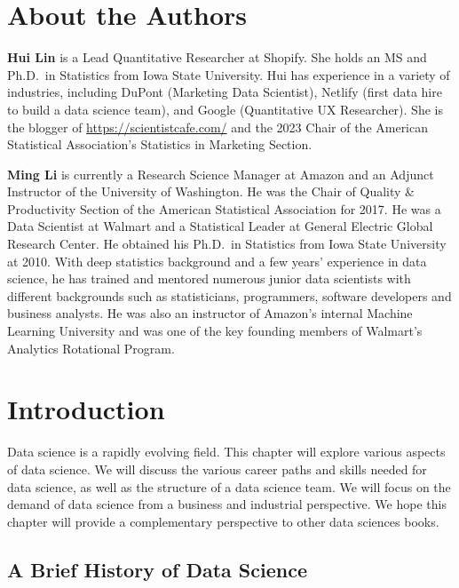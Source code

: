 \documentclass[
  12pt,
]{krantz}
\begin{document}
\hypertarget{about-the-authors}{%
\chapter*{About the Authors}\label{about-the-authors}}


\textbf{Hui Lin} is a Lead Quantitative Researcher at Shopify. She holds an MS and Ph.D.~in Statistics from Iowa State University. Hui has experience in a variety of industries, including DuPont (Marketing Data Scientist), Netlify (first data hire to build a data science team), and Google (Quantitative UX Researcher). She is the blogger of \url{https://scientistcafe.com/} and the 2023 Chair of the American Statistical Association's Statistics in Marketing Section.

\textbf{Ming Li} is currently a Research Science Manager at Amazon and an Adjunct Instructor of the University of Washington. He was the Chair of Quality \& Productivity Section of the American Statistical Association for 2017. He was a Data Scientist at Walmart and a Statistical Leader at General Electric Global Research Center. He obtained his Ph.D.~in Statistics from Iowa State University at 2010. With deep statistics background and a few years' experience in data science, he has trained and mentored numerous junior data scientists with different backgrounds such as statisticians, programmers, software developers and business analysts. He was also an instructor of Amazon's internal Machine Learning University and was one of the key founding members of Walmart's Analytics Rotational Program.

\mainmatter

\hypertarget{introduction}{%
\chapter{Introduction}\label{introduction}}

Data science is a rapidly evolving field. This chapter will explore various aspects of data science. We will discuss the various career paths and skills needed for data science, as well as the structure of a data science team. We will focus on the demand of data science from a business and industrial perspective. We hope this chapter will provide a complementary perspective to other data sciences books.

\hypertarget{a-brief-history-of-data-science}{%
\section{A Brief History of Data Science}\label{a-brief-history-of-data-science}}
\end{document}
